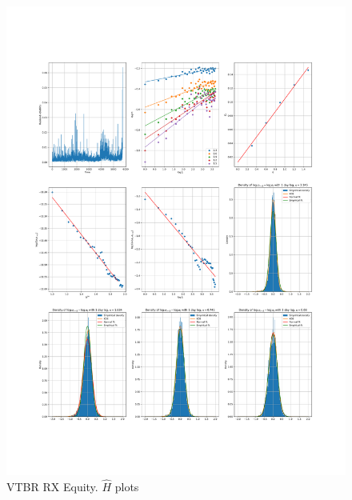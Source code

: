     \begin{figure}[h]
        \centering
        \includegraphics[width=\textwidth]{fig/VTBR RX Equity.pdf}
        \caption{VTBR RX Equity. $\hat{H}$ plots}
    \end{figure} 
        

